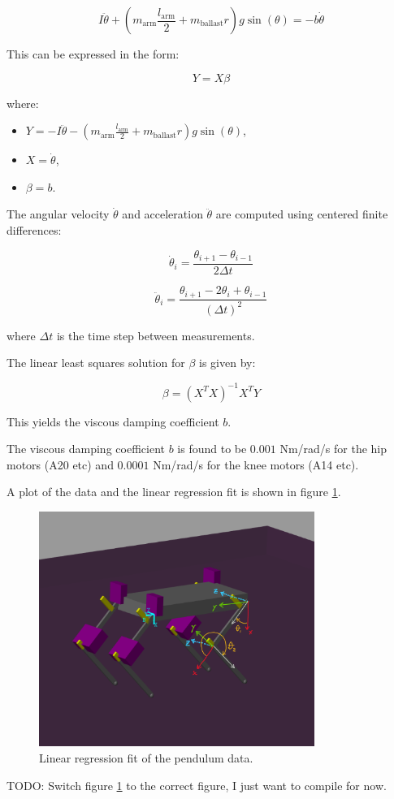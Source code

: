 \[
    I \ddot{\theta} + (m_{\text{arm}} \frac{l_{\text{arm}}}{2} + m_{\text{ballast}} r) g \sin(\theta) = -b \dot{\theta}
\]

This can be expressed in the form:

\[
Y = X \beta
\]

where:
\begin{itemize}
    \item \( Y = -I \ddot{\theta} - (m_{\text{arm}} \frac{l_{\text{arm}}}{2} + m_{\text{ballast}} r) g \sin(\theta) \),
    \item \( X = \dot{\theta} \),
    \item \( \beta = b \).
\end{itemize}

The angular velocity \( \dot{\theta} \) and acceleration \( \ddot{\theta} \) are computed using centered finite differences:

\[
\dot{\theta}_i = \frac{\theta_{i+1} - \theta_{i-1}}{2\Delta t}
\]

\[
\ddot{\theta}_i = \frac{\theta_{i+1} - 2\theta_i + \theta_{i-1}}{(\Delta t)^2}
\]

where \(\Delta t\) is the time step between measurements.

The linear least squares solution for \( \beta \) is given by:

\[
\beta = (X^T X)^{-1} X^T Y
\]

This yields the viscous damping coefficient \( b \).

The viscous damping coefficient \( b \) is found to be \( 0.001 \) Nm/rad/s for the hip motors (A20 etc) and \( 0.0001 \) Nm/rad/s for the knee motors (A14 etc).

A plot of the data and the linear regression fit is shown in figure \ref{fig:results:motor_friction_estimation:linear_regression}.

\begin{figure}[h]
    \centering
    \includegraphics[width=0.8\textwidth]{Images/angle_conventions.png}
    \caption{Linear regression fit of the pendulum data.}
    \label{fig:results:motor_friction_estimation:linear_regression}
\end{figure}

TODO: Switch figure \ref{fig:results:motor_friction_estimation:linear_regression} to the correct figure, I just want to compile for now. 